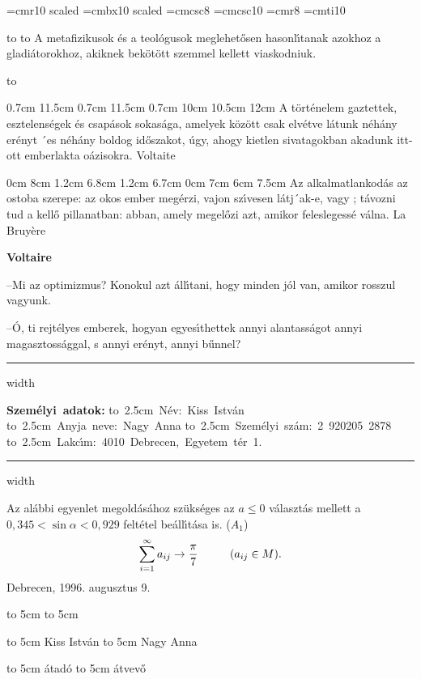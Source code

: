 

\UseAMSsymbols

\hsize=12.5cm
\font\bigletter=cmr10 scaled 
\font\bigbold=cmbx10 scaled 
\font\smallcap=cmcsc8
\font\bigcap=cmcsc10
\font\headl=cmr8
\font\cursive=cmti10
\nopagenumbers


\vglue 24pt
\vbox{\hbox to
        \hbox to
}
\vskip 0.2cm
A metafizikusok \'es a teol\'ogusok meglehet\H osen hasonl\'\i tanak azokhoz a gladi\'a\-torokhoz, akiknek bek\"ot\"ott szemmel kellett viaskodniuk.

\hbox to

 0.7cm 11.5cm 0.7cm 11.5cm 0.7cm 10cm 10.5cm 12cm
A t\"ort\'enelem gaztettek, esztelens\'egek \'es csap\'asok sokas\'aga, amelyek
k\"oz\"ott csak elv\'etve l\'atunk n\'eh\'any er\'enyt ´es n\'eh\'any boldog id\H oszakot, \'ugy,
ahogy kietlen sivatagokban akadunk itt-ott emberlakta o\'azisokra.
{\smallcap Voltaite}

 0cm 8cm 1.2cm 6.8cm 1.2cm 6.7cm 0cm 7cm 6cm 7.5cm
\noindent Az alkalmatlankod\'as az ostoba szerepe: az okos ember
meg\'erzi, vajon sz{\'\i}vesen l\'atj´ak-e, vagy ;
t\'avozni tud a kell\H o pillanatban: abban,
amely megel\H ozi azt, amikor feleslegess\'e v\'alna.
{\smallcap La Bruy\`ere}

\hbox{\noindent\bf Voltaire}
\item{--}{Mi az optimizmus? Konokul azt \'all\'\i tani, hogy minden j\'ol van, amikor rosszul vagyunk.}
\item{--}{\'O, ti rejt\'elyes emberek, hogyan egyes\'\i thettek annyi alantass\'agot annyi magasztoss\'aggal, s annyi er\'enyt, annyi b\H unnel?}
\vskip 0.1in
\hrule width \hsize
\vskip 0.3cm

\noindent \hbox{\bf Szem\'elyi adatok:}
\smallskip
\indent\vbox{
    \hbox{\hbox to 2.5cm {N\'ev:\hfil} \hbox{Kiss Istv\'an}}
    \hbox{\hbox to 2.5cm {Anyja neve:\hfil} \hbox{Nagy Anna}}
    \hbox{\hbox to 2.5cm {Szem\'elyi sz\'am:\hfil} \hbox{2 920205 2878}}
    \hbox{\hbox to 2.5cm {Lakc{\'\i}m:\hfil} \hbox{4010 Debrecen, Egyetem t\'er 1.}}
}
\vskip 0.1in
\hrule width \hsize
\vskip 0.1in

Az al\'abbi  egyenlet megold\'as\'ahoz sz\"uks\'eges az $a \leq 0$ v\'alaszt\'as mellett a $0,345 < \sin \alpha < 0,929 $ felt\'etel be\'all\'\i t\'asa is.
\vskip 1cm
($A_1$)
\vskip -1cm $$\sum_{i=1}^{\infty} a_{ij} \to {\pi \over 7} \hskip 1cm (a_{ij} \in M).$$
\vskip 1cm
\noindent Debrecen, 1996. augusztus 9.
\vskip 1cm
\centerline {\hbox to 5cm {\dotfill} \hfil \hbox to 5cm {\dotfill}}
\centerline {\hbox to 5cm {\hfil Kiss Istv\'an \hfil} \hfil \hbox to 5cm {\hfil Nagy Anna \hfil}}
\centerline {\hbox to 5cm {\hfil \'atad\'o \hfil} \hfil \hbox to 5cm {\hfil \'atvev\H o \hfil}}

\bye
